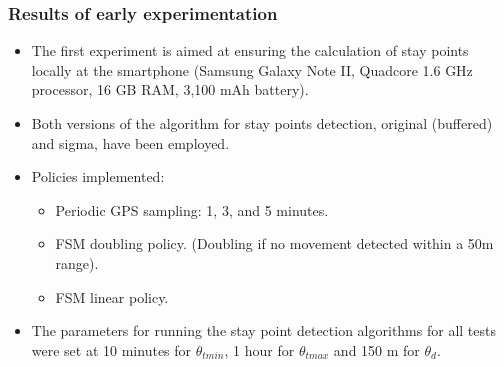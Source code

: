 \documentclass[compress,9pt,xcolor={dvipsnames,table}]{beamer}
\begin{document}
\begin{frame}[t]\frametitle{Results of early experimentation}
\small
\begin{itemize}
  \item The first experiment is aimed at ensuring the calculation of stay points locally at the smartphone (Samsung Galaxy Note II, Quadcore 1.6 GHz processor, 16 GB RAM, 3,100 mAh battery).
  \item Both versions of the algorithm for stay points detection, original (buffered) and sigma, have been employed.  
  \item Policies implemented:
  \begin{itemize}
  \item Periodic GPS sampling: 1, 3, and 5 minutes.
  \item FSM doubling policy. (Doubling if no movement detected within a 50m range).
  \item FSM linear policy.
  \end{itemize}
  \item The parameters for running the stay point detection algorithms for all tests were set at 10 minutes for $\theta_{tmin}$, 1 hour for $\theta_{tmax}$ and 150 m for $\theta_{d}$.
\end{itemize}
\begin{table}[t]
\small{}
\centering
{}
\end{table}
\end{frame}
\end{document}
